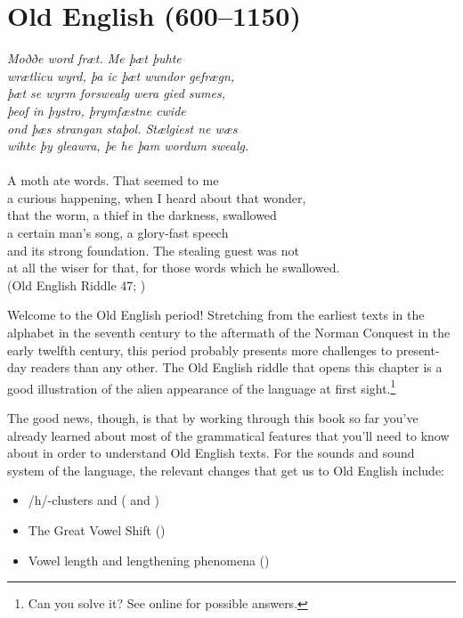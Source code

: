 \chapter{Old English (600--1150)}\label{OE}


\begin{flushright}
\emph{Moððe word fræt. Me þæt þuhte\\
wrætlicu wyrd,     þa ic þæt wundor gefrægn,\\
þæt se wyrm forswealg     wera gied sumes,\\
þeof in þystro,     þrymfæstne cwide\\
ond þæs strangan staþol.    Stælgiest ne wæs\\
wihte þy gleawra,    þe he þam wordum swealg.}\\
~\\
A moth ate words. That seemed to me\\
a curious happening, when I heard about that wonder,\\
that the worm, a thief in the darkness, swallowed\\
a certain man's song, a glory-fast speech\\
and its strong foundation. The stealing guest was not\\
at all the wiser for that, for those words which he swallowed.\\
(Old English Riddle 47; \citealp{Cavell2015})
\end{flushright}

\noindent Welcome to the Old English period! Stretching from the earliest texts in the  alphabet in the seventh century to the aftermath of the Norman Conquest in the early twelfth century, this period probably presents more challenges to present-day readers than any other. The Old English riddle that opens this chapter is a good illustration of the alien appearance of the language at first sight.\footnote{Can you solve it? See \citet{Cavell2015} online for possible answers.}

The good news, though, is that by working through this book so far you've already learned about most of the grammatical features that you'll need to know about in order to understand Old English texts. For the sounds and sound system of the language, the relevant changes that get us to Old English include:

\begin{itemize}
    \item /h/-clusters and  ( and )
    \item The Great Vowel Shift ()
    \item Vowel length and lengthening phenomena ()
\end{itemize}

